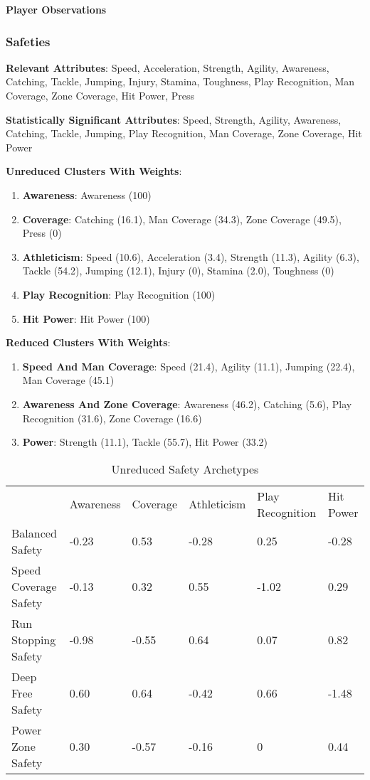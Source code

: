 \documentclass[11pt]{article}
\begin{document}
\textbf{Player Observations}

\subsubsection{Safeties}

\textbf{Relevant Attributes}: Speed, Acceleration, Strength, Agility, Awareness, Catching, Tackle, Jumping, Injury, Stamina, Toughness, Play Recognition, Man Coverage, Zone Coverage, Hit Power, Press

\textbf{Statistically Significant Attributes}: Speed, Strength, Agility, Awareness, Catching, Tackle, Jumping, Play Recognition, Man Coverage, Zone Coverage, Hit Power

\textbf{Unreduced Clusters With Weights}:

\begin{enumerate}
\item{\textbf{Awareness}}: Awareness (100)
\item{\textbf{Coverage}}: Catching (16.1), Man Coverage (34.3), Zone Coverage (49.5), Press (0)
\item{\textbf{Athleticism}}: Speed (10.6), Acceleration (3.4), Strength (11.3), Agility (6.3), Tackle (54.2), Jumping (12.1), Injury (0), Stamina (2.0), Toughness (0)
\item{\textbf{Play Recognition}}: Play Recognition (100)
\item{\textbf{Hit Power}}: Hit Power (100)
\end{enumerate}

\textbf{Reduced Clusters With Weights}:

\begin{enumerate}
\item{\textbf{Speed And Man Coverage}}: Speed (21.4), Agility (11.1), Jumping (22.4), Man Coverage (45.1)
\item{\textbf{Awareness And Zone Coverage}}: Awareness (46.2), Catching (5.6), Play Recognition (31.6), Zone Coverage (16.6)
\item{\textbf{Power}}: Strength (11.1), Tackle (55.7), Hit Power (33.2)
\end{enumerate}

\begin{table}[]
\centering
\caption{Unreduced Safety Archetypes}
\label{UnreducedSafety}
\begin{tabular}{llllll}
                      & Awareness & Coverage & Athleticism & Play Recognition & Hit Power \\
Balanced Safety       & -0.23     & 0.53     & -0.28       & 0.25             & -0.28     \\
Speed Coverage Safety & -0.13     & 0.32     & 0.55        & -1.02            & 0.29      \\
Run Stopping Safety   & -0.98     & -0.55    & 0.64        & 0.07             & 0.82      \\
Deep Free Safety      & 0.60      & 0.64     & -0.42       & 0.66             & -1.48     \\
Power Zone Safety     & 0.30      & -0.57    & -0.16       & 0                & 0.44     
\end{tabular}
\end{table}
\end{document}
